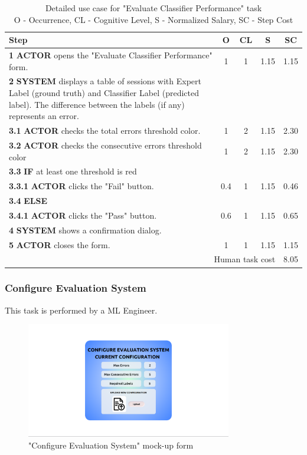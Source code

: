 \begin{table}[H]
\centering
\begin{tabularx}{\textwidth}{|X|c|c|c|c|}
\hline
\textbf{Step} & \textbf{O} & \textbf{CL} & \textbf{S} & \textbf{SC} \\
\hline
\textbf{1} \textbf{ACTOR} opens the "Evaluate Classifier Performance" form. & 1 & 1 & 1.15 & 1.15 \\
\hline
\textbf{2} \textbf{SYSTEM} displays a table of sessions with Expert Label (ground truth) and Classifier Label (predicted label). 
The difference between the labels (if any) represents an error. & & & & \\
\hline
\textbf{3.1} \textbf{ACTOR} checks the total errors threshold color. &1 & 2& 1.15&2.30 \\
\hline
\textbf{3.2} \textbf{ACTOR} checks the consecutive errors threshold color &1 & 2& 1.15&2.30 \\
\hline
\textbf{3.3} \textbf{IF} at least one threshold is red &  &  & & \\
\hline
\textbf{3.3.1} \textbf{ACTOR} clicks the "Fail" button. &0.4 &1 & 1.15&0.46 \\
\hline
\textbf{3.4} \textbf{ELSE} & & & & \\
\hline
\textbf{3.4.1} \textbf{ACTOR} clicks the "Pass" button. &0.6 &1 & 1.15&0.65\\
\hline
\textbf{4} \textbf{SYSTEM} shows a confirmation dialog. & & & &\\
\hline
\textbf{5} \textbf{ACTOR} closes the form. &1 &1 & 1.15&1.15\\
\hline
\multicolumn{4}{|r|}{Human task cost} &8.05 \\
\hline
\end{tabularx}
\caption{Detailed use case for "Evaluate Classifier Performance" task\\ 
O - Occurrence, CL - Cognitive Level, S - Normalized Salary, SC - Step Cost}
\label{table:evaluate_classifier_performance}
\end{table}

\subsubsection{Configure Evaluation System}

This task is performed by a ML Engineer.

\begin{figure}[H]
\centering
\includegraphics[width=0.8\textwidth]{figures/ui_configure_evaluation.png}
\caption{"Configure Evaluation System" mock-up form}
\end{figure}

